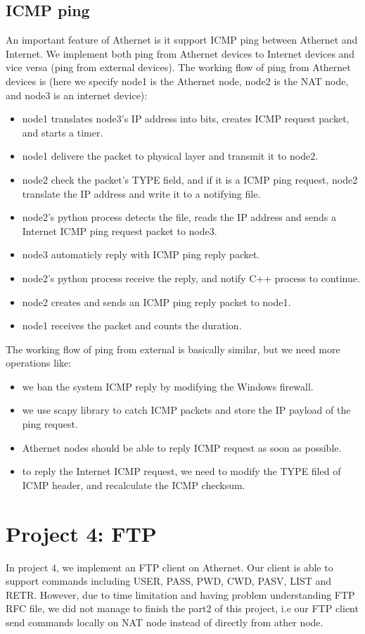 \documentclass[11pt, conference]{IEEEtran}
\begin{document}
\subsection{ICMP ping}
An important feature of Athernet is it support ICMP ping between Athernet and Internet. We implement both ping from Athernet devices to Internet devices and vice versa (ping from external devices). The working flow of
ping from Athernet devices is (here we specify node1 is the Athernet node, node2 is the NAT node, and node3 is an internet device):
\begin{itemize}
    \item node1 translates node3's IP address into bits, creates ICMP request packet, and starts a timer.
    \item node1 delivere the packet to physical layer and transmit it to node2.
    \item node2 check the packet's TYPE field, and if it is a ICMP ping request, node2 translate the IP address and write it to a notifying file.
    \item node2's python process detects the file, reads the IP address and sends a Internet ICMP ping request packet to node3.
    \item node3 automaticly reply with ICMP ping reply packet.
    \item node2's python process receive the reply, and notify C++ process to continue.
    \item node2 creates and sends an ICMP ping reply packet to node1.
    \item node1 receives the packet and counts the duration.
\end{itemize}
The working flow of ping from external is basically similar, but we need more operations like:
\begin{itemize}
    \item we ban the system ICMP reply by modifying the Windows firewall.
    \item we use scapy library to catch ICMP packets and store the IP payload of the ping request.
    \item Athernet nodes should be able to reply ICMP request as soon as possible.
    \item to reply the Internet ICMP request, we need to modify the TYPE filed of ICMP header, and recalculate the ICMP checksum.
\end{itemize}


\section{{Project 4: FTP}}
    In project 4, we implement an FTP client on Athernet.
    Our client is able to support commands including USER, PASS,
    PWD, CWD, PASV, LIST and RETR. However, due to time limitation and having
    problem understanding FTP RFC file, we did not manage to finish the part2 of this project, i.e
    our FTP client send commands locally on NAT node instead of directly from ather node.
\end{document}
